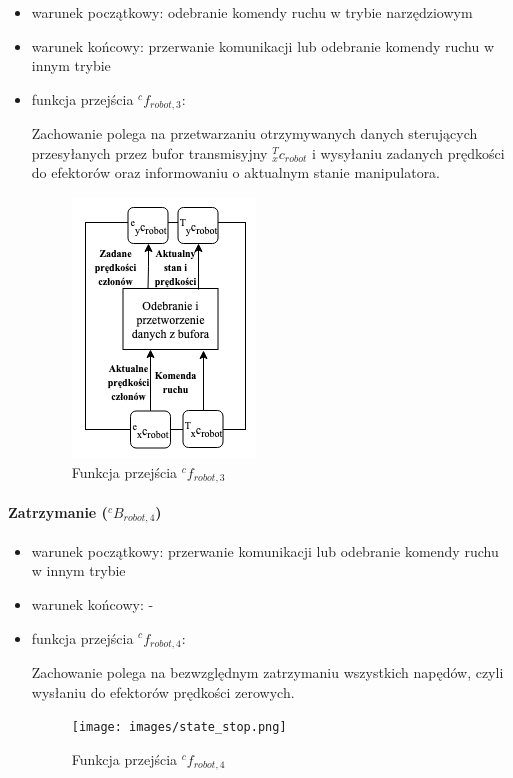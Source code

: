 \documentclass[a4paper, 12pt, twoside]{article}
\begin{document}
\begin{itemize} 
\item warunek początkowy: odebranie komendy ruchu w trybie narzędziowym
\item warunek końcowy: przerwanie komunikacji lub odebranie komendy ruchu w innym trybie
\item funkcja przejścia $^cf_{robot,3}$:

Zachowanie polega na przetwarzaniu otrzymywanych danych sterujących przesyłanych przez bufor transmisyjny $^T_xc_{robot}$ i wysyłaniu zadanych prędkości do efektorów oraz informowaniu o aktualnym stanie manipulatora. 

\begin{figure}[hbt!]
\centering
\includegraphics[width=0.3\linewidth]{images/state_tool.png}
\caption{Funkcja przejścia $^cf_{robot,3}$ }
\label{fig:state_tool}
\end{figure}
\end{itemize}

\paragraph{Zatrzymanie ($^cB_{robot,4}$)}

\begin{itemize}
\item warunek początkowy: przerwanie komunikacji lub odebranie komendy ruchu w innym trybie
\item warunek końcowy: -
\item funkcja przejścia $^cf_{robot,4}$:

Zachowanie polega na bezwzględnym zatrzymaniu wszystkich napędów, czyli wysłaniu do efektorów prędkości zerowych.

\begin{figure}[hbt!]
\centering
\texttt{[image: images/state\_stop.png]}
\caption{Funkcja przejścia $^cf_{robot,4}$ }
\label{fig:state_stop}
\end{figure}
\end{itemize}
\end{document}
